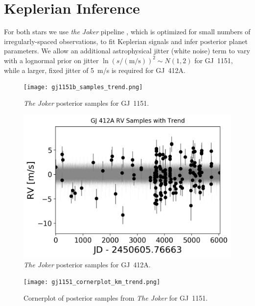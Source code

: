 \documentclass[modern]{aastex62}
\begin{document}
\section{Keplerian Inference}
\label{sec:joker}

For both stars we use \textit{the Joker} pipeline \citep{joker}, which is optimized for small numbers of irregularly-spaced observations, to fit Keplerian signals and infer posterior planet parameters. We allow an additional astrophysical jitter (white noise) term to vary with a lognormal prior on jitter $\ln {(s/(\text{m/s}))^2} \sim {N}(1,2)$ for GJ~1151, while a larger, fixed jitter of 5~m/s is required for GJ~412A.

\begin{figure}
\noindent\texttt{[image: gj1151b\_samples\_trend.png]}

\caption{\label{jokermodel1151}
\textit{The Joker} posterior samples for GJ~1151.
}
\end{figure}

\begin{figure}
\noindent\includegraphics[width=15cm,keepaspectratio]{gj412A_samples_trend.png}

\caption{\label{jokermodel412A}
\textit{The Joker} posterior samples for GJ~412A.
}
\end{figure}

\begin{figure}
\noindent\texttt{[image: gj1151\_cornerplot\_km\_trend.png]}

\caption{\label{cornerplot}
Cornerplot of posterior samples from \textit{The Joker} for GJ~1151.
}
\end{figure}
\end{document}
